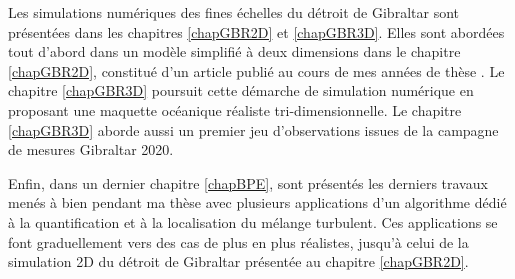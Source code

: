 Les simulations numériques des fines échelles du détroit de Gibraltar sont présentées dans les chapitres \ref{chapGBR2D} et \ref{chapGBR3D}. Elles sont abordées tout d'abord dans un modèle simplifié à deux dimensions dans le chapitre \ref{chapGBR2D}, constitué d'un article publié au cours de mes années de thèse \citep{hilt_2020}. Le chapitre \ref{chapGBR3D} poursuit cette démarche de simulation numérique en proposant une maquette océanique réaliste tri-dimensionnelle. Le chapitre \ref{chapGBR3D} aborde aussi un premier jeu d'observations issues de la campagne de mesures Gibraltar 2020.

Enfin, dans un dernier chapitre \ref{chapBPE}, sont présentés les derniers travaux menés à bien pendant ma thèse avec plusieurs applications d'un algorithme dédié à la quantification et à la localisation du mélange turbulent. Ces applications se font graduellement vers des cas de plus en plus réalistes, jusqu'à celui de la simulation 2D du détroit de Gibraltar présentée au chapitre \ref{chapGBR2D}.

